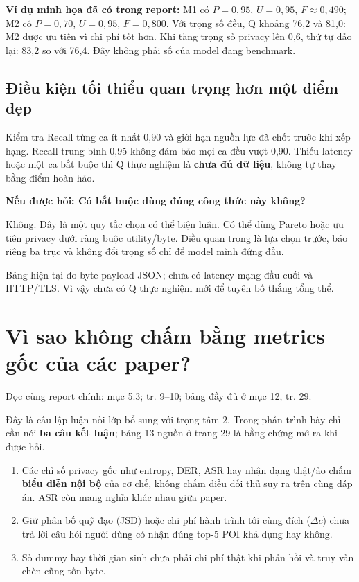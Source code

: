 \documentclass[10pt,a4paper]{article}
\newcommand{\key}[1]{\par\smallskip\noindent\colorbox{pale}{\parbox{\dimexpr\linewidth-2\fboxsep}{#1}}\par\smallskip}
\newcommand{\ask}[2]{\par\textbf{Nếu được hỏi: #1}\par #2\par}
\newcommand{\where}[1]{\par{\small\color{gray}Đọc cùng report chính: #1.}\par}
\newcommand{\guidepage}[1]{\clearpage\section{#1}}
\begin{document}
\textbf{Ví dụ minh họa đã có trong report:} M1 có $P=0,95$, $U=0,95$, $F\approx0,490$; M2 có $P=0,70$, $U=0,95$, $F=0,800$. Với trọng số đều, Q khoảng 76,2 và 81,0: M2 được ưu tiên vì chi phí tốt hơn. Khi tăng trọng số privacy lên 0,6, thứ tự đảo lại: 83,2 so với 76,4. Đây không phải số của model đang benchmark.

\subsection*{Điều kiện tối thiểu quan trọng hơn một điểm đẹp}
Kiểm tra Recall từng ca ít nhất 0,90 và giới hạn nguồn lực đã chốt trước khi xếp hạng. Recall trung bình 0,95 không đảm bảo mọi ca đều vượt 0,90. Thiếu latency hoặc một ca bắt buộc thì Q thực nghiệm là \textbf{chưa đủ dữ liệu}, không tự thay bằng điểm hoàn hảo.

\ask{Có bắt buộc dùng đúng công thức này không?}{Không. Đây là một quy tắc chọn có thể biện luận. Có thể dùng Pareto hoặc ưu tiên privacy dưới ràng buộc utility/byte. Điều quan trọng là lựa chọn trước, báo riêng ba trục và không đổi trọng số chỉ để model mình đứng đầu.}
\key{Bảng hiện tại đo byte payload JSON; chưa có latency mạng đầu-cuối và HTTP/TLS. Vì vậy chưa có Q thực nghiệm mới để tuyên bố thắng tổng thể.}

\guidepage{Vì sao không chấm bằng metrics gốc của các paper?}
\where{mục 5.3; tr. 9--10; bảng đầy đủ ở mục 12, tr. 29}
Đây là câu lập luận nối lớp bổ sung với trọng tâm 2. Trong phần trình bày chỉ cần nói \textbf{ba câu kết luận}; bảng 13 nguồn ở trang 29 là bằng chứng mở ra khi được hỏi.

\begin{enumerate}
\item Các chỉ số privacy gốc như entropy, DER, ASR hay nhận dạng thật/ảo chấm \textbf{biểu diễn nội bộ} của cơ chế, không chấm điều đối thủ suy ra trên cùng đáp án. ASR còn mang nghĩa khác nhau giữa paper.
\item Giữ phân bố quỹ đạo (JSD) hoặc chi phí hành trình tới cùng đích ($\Delta c$) chưa trả lời câu hỏi người dùng có nhận đúng top-5 POI khả dụng hay không.
\item Số dummy hay thời gian sinh chưa phải chi phí thật khi phản hồi và truy vấn chèn cũng tốn byte.
\end{enumerate}
\end{document}
